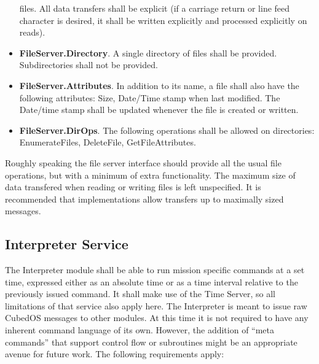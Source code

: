 \begin{itemize}
  files. All data transfers shall be explicit (if a carriage return or line feed character is
  desired, it shall be written explicitly and processed explicitly on reads).
\item \textbf{FileServer.Directory}. A single directory of files shall be provided.
  Subdirectories shall not be provided.
\item \textbf{FileServer.Attributes}. In addition to its name, a file shall also have the
  following attributes: Size, Date/Time stamp when last modified. The Date/time stamp shall be
  updated whenever the file is created or written.
\item \textbf{FileServer.DirOps}. The following operations shall be allowed on directories:
  EnumerateFiles, DeleteFile, GetFileAttributes.
\end{itemize}

Roughly speaking the file server interface should provide all the usual file operations, but
with a minimum of extra functionality. The maximum size of data transfered when reading or
writing files is left unspecified. It is recommended that implementations allow transfers up to
maximally sized messages.


\subsection{Interpreter Service}
\label{sec:interpreter-service}

The Interpreter module shall be able to run mission specific commands at a set time, expressed
either as an absolute time or as a time interval relative to the previously issued command. It
shall make use of the Time Server, so all limitations of that service also apply here. The
Interpreter is meant to issue raw CubedOS messages to other modules. At this time it is not
required to have any inherent command language of its own. However, the addition of ``meta
commands'' that support control flow or subroutines might be an appropriate avenue for future
work. The following requirements apply:

